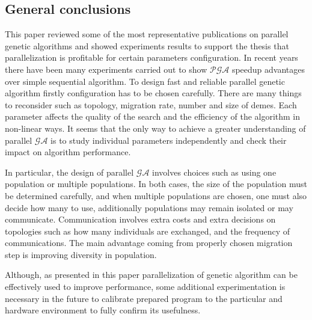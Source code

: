 \subsection{General conclusions}
This paper reviewed some of the most representative publications on parallel
genetic algorithms and showed experiments results to support the thesis that
parallelization is profitable for certain parameters configuration. 
In recent years there have been many experiments carried 
out to show $\mathcal{PGA}$ speedup advantages over simple sequential algorithm. To design
fast and reliable parallel genetic algorithm firstly configuration has to be
chosen carefully. There are many things to reconsider such as topology,
migration rate, number and size of demes. Each parameter affects the quality of
the search and the efficiency of the algorithm in non-linear ways. It seems that
the only way to achieve a greater understanding of parallel $\mathcal{GA}$ is to
study individual parameters independently and check their impact on algorithm
performance.

In particular, the design of parallel $\mathcal{GA}$ involves choices such as using one
population or multiple populations. In both cases, the size of the population
must be determined carefully, and when multiple populations are chosen, one
must also decide how many to use, additionally populations may remain isolated
or may communicate. Communication involves extra costs and extra
decisions on topologies such as how many individuals are exchanged, and the
frequency of communications. The main advantage coming from properly chosen
migration step is improving  diversity in population.

Although, as presented in this paper parallelization of genetic algorithm can be
effectively used to improve performance, some additional experimentation is
necessary in the future to calibrate prepared program to the
particular and hardware environment to fully confirm its usefulness.
